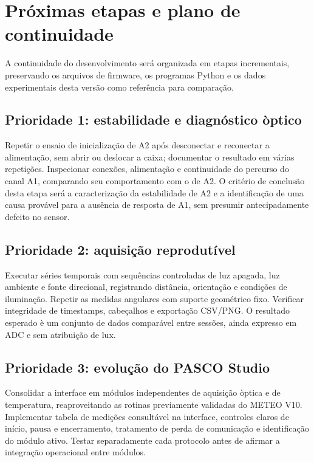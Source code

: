 \documentclass[10pt,a4paper,twocolumn]{article}
\begin{document}
\section{Pr\'oximas etapas e plano de continuidade}
A continuidade do desenvolvimento ser\'a organizada em etapas incrementais, preservando os arquivos de firmware, os programas Python e os dados experimentais desta vers\~ao como refer\^encia para compara\c{c}\~ao.

\subsection{Prioridade 1: estabilidade e diagn\'ostico \`optico}
Repetir o ensaio de inicializa\c{c}\~ao de A2 ap\'os desconectar e reconectar a alimenta\c{c}\~ao, sem abrir ou deslocar a caixa; documentar o resultado em v\'arias repeti\c{c}\~oes. Inspecionar conex\~oes, alimenta\c{c}\~ao e continuidade do percurso do canal A1, comparando seu comportamento com o de A2. O crit\'erio de conclus\~ao desta etapa ser\'a a caracteriza\c{c}\~ao da estabilidade de A2 e a identifica\c{c}\~ao de uma causa prov\'avel para a aus\^encia de resposta de A1, sem presumir antecipadamente defeito no sensor.

\subsection{Prioridade 2: aquisi\c{c}\~ao reprodut\'ivel}
Executar s\'eries temporais com sequ\^encias controladas de luz apagada, luz ambiente e fonte direcional, registrando dist\^ancia, orienta\c{c}\~ao e condi\c{c}\~oes de ilumina\c{c}\~ao. Repetir as medidas angulares com suporte geom\'etrico fixo. Verificar integridade de timestamps, cabe\c{c}alhos e exporta\c{c}\~ao CSV/PNG. O resultado esperado \`e um conjunto de dados compar\'avel entre sess\~oes, ainda expresso em ADC e sem atribui\c{c}\~ao de lux.

\subsection{Prioridade 3: evolu\c{c}\~ao do PASCO Studio}
Consolidar a interface em m\'odulos independentes de aquisi\c{c}\~ao \`optica e de temperatura, reaproveitando as rotinas previamente validadas do METEO V10. Implementar tabela de medi\c{c}\~oes consult\'avel na interface, controles claros de in\'icio, pausa e encerramento, tratamento de perda de comunica\c{c}\~ao e identifica\c{c}\~ao do m\'odulo ativo. Testar separadamente cada protocolo antes de afirmar a integra\c{c}\~ao operacional entre m\'odulos.
\end{document}
